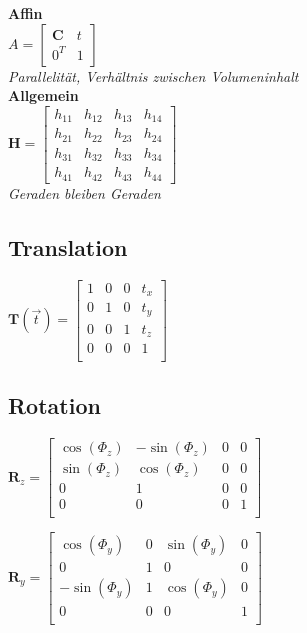 \textbf{Affin} \\
$A = \begin{bmatrix}
    \mathbf{C} & t \\
    0^T & 1
\end{bmatrix}$ \\
\textit{Parallelität, Verhältnis zwischen Volumeninhalt} \\

\textbf{Allgemein} \\
$\mathbf{H} = \begin{bmatrix}
    h_{11} & h_{12} & h_{13} & h_{14} \\
    h_{21} & h_{22} & h_{23} & h_{24} \\
    h_{31} & h_{32} & h_{33} & h_{34} \\
    h_{41} & h_{42} & h_{43} & h_{44}
\end{bmatrix}$ \\
\textit{Geraden bleiben Geraden} \\

\subsection{Translation}

$\mathbf{T}(\vec{t}) = \left[\begin{array}{ccc|c}
    1 & 0 & 0 & t_x \\
    0 & 1 & 0 & t_y \\
    0 & 0 & 1 & t_z \\
    \hline
    0 & 0 & 0 & 1 \\
\end{array}\right]$

\subsection{Rotation}

$\mathbf{R}_z = \left[\begin{array}{ccc|c}
    \cos(\Phi_z) & -\sin(\Phi_z) & 0 & 0 \\
    \sin(\Phi_z) & \cos(\Phi_z) & 0 & 0 \\
    0 & 1 & 0 & 0 \\
    \hline
    0 & 0 & 0 & 1 \\
\end{array}\right]$

$\mathbf{R}_y = \left[\begin{array}{ccc|c}
    \cos(\Phi_y) & 0 & \sin(\Phi_y) & 0 \\
    0 & 1 & 0 & 0 \\
    -\sin(\Phi_y) & 1 & \cos(\Phi_y) & 0 \\
    \hline
    0 & 0 & 0 & 1 \\
\end{array}\right]$

